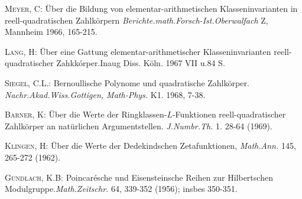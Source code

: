 \begin{thebibliography}{99}
 \textsc{Meyer, C:} \"Uber die Bildung von
  elementar-arithmetischen Klasseninvarianten in reell-quadratischen
  Zahlk\"orpern {\em Berichte.\@ math.\@ Forsch-Ist.\@ Oberwalfach} Z,
  Mannheim 1966, 165-215.

\textsc{Lang, H:} \"Uber eine Gattung elementar-arithmetischer
Klasseninvarianten reell-quadratischer Zahkk\'orper.\@ Inaug Diss.\@
K\"oln. 1967 VII u.\@ 84 S.

\textsc{Siegel, C.\@ L.:} Bernoullische Polynome und quadratische
Zahlk\"orper. {\em Nachr.\@ Akad.\@ Wiss.\@ Gottigen, Math-Phys.}
K1. 1968, 7-38.

\textsc{Barner, K:} \"Uber die Werte der Ringklassen-$L$-Funktionen
reell-quadratischer Zahlk\"orper an nat\"urlichen
Argumentstellen. {\em J.\@ Numbr.\@ Th.\@ } 1. 28-64 (1969).


 \textsc{Klingen, H:} \"Uber die Werte der Dedekindschen
  Zetafunktionen, {\em Math.\@ Ann.} 145, 265-272 (1962).

 \textsc{Gundlach, K.\@ B:} Poincar\'esche und
  Eisensteinsche Reihen 
  zur Hilbertschen Modulgruppe.\@ {\em Math.\@ Zeitschr.} 64, 339-352
  (1956); insbes 350-351.
\end{thebibliography}
